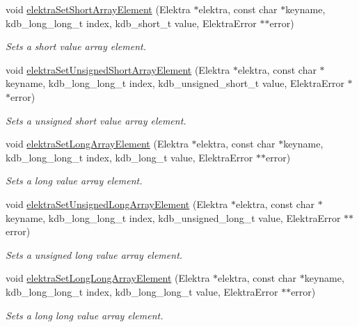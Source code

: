 \begin{DoxyCompactItemize}
void \hyperlink{group__highlevel_gad2e6abba0f2eb7a1b47c414edd14d06c}{elektra\+Set\+Short\+Array\+Element} (Elektra $\ast$elektra, const char $\ast$keyname, kdb\+\_\+long\+\_\+long\+\_\+t index, kdb\+\_\+short\+\_\+t value, Elektra\+Error $\ast$$\ast$error)
\begin{DoxyCompactList}\small\item\em Sets a short value array element. \end{DoxyCompactList}\item 
void \hyperlink{group__highlevel_ga741c5229d88a8f92efd80f50958ade06}{elektra\+Set\+Unsigned\+Short\+Array\+Element} (Elektra $\ast$elektra, const char $\ast$keyname, kdb\+\_\+long\+\_\+long\+\_\+t index, kdb\+\_\+unsigned\+\_\+short\+\_\+t value, Elektra\+Error $\ast$$\ast$error)
\begin{DoxyCompactList}\small\item\em Sets a unsigned short value array element. \end{DoxyCompactList}\item 
void \hyperlink{group__highlevel_ga085ab1a0bd4a0eda44230accac22cb23}{elektra\+Set\+Long\+Array\+Element} (Elektra $\ast$elektra, const char $\ast$keyname, kdb\+\_\+long\+\_\+long\+\_\+t index, kdb\+\_\+long\+\_\+t value, Elektra\+Error $\ast$$\ast$error)
\begin{DoxyCompactList}\small\item\em Sets a long value array element. \end{DoxyCompactList}\item 
void \hyperlink{group__highlevel_ga074028aab60ec3dad24940c344c9fd05}{elektra\+Set\+Unsigned\+Long\+Array\+Element} (Elektra $\ast$elektra, const char $\ast$keyname, kdb\+\_\+long\+\_\+long\+\_\+t index, kdb\+\_\+unsigned\+\_\+long\+\_\+t value, Elektra\+Error $\ast$$\ast$error)
\begin{DoxyCompactList}\small\item\em Sets a unsigned long value array element. \end{DoxyCompactList}\item 
void \hyperlink{group__highlevel_ga7f017b31c2cada6f5739fda082404f80}{elektra\+Set\+Long\+Long\+Array\+Element} (Elektra $\ast$elektra, const char $\ast$keyname, kdb\+\_\+long\+\_\+long\+\_\+t index, kdb\+\_\+long\+\_\+long\+\_\+t value, Elektra\+Error $\ast$$\ast$error)
\begin{DoxyCompactList}\small\item\em Sets a long long value array element. \end{DoxyCompactList}\item 
$$
\end{DoxyCompactItemize}
